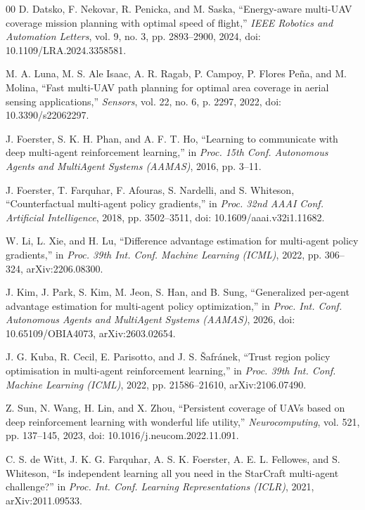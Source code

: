\documentclass[conference]{IEEEtran}
\begin{document}
\begin{thebibliography}{00}
D. Datsko, F. Nekovar, R. Penicka, and M. Saska, ``Energy-aware multi-UAV coverage mission planning with optimal speed of flight,'' \emph{IEEE Robotics and Automation Letters}, vol. 9, no. 3, pp. 2893--2900, 2024, doi: 10.1109/LRA.2024.3358581.

M. A. Luna, M. S. Ale Isaac, A. R. Ragab, P. Campoy, P. Flores Pe\~na, and M. Molina, ``Fast multi-UAV path planning for optimal area coverage in aerial sensing applications,'' \emph{Sensors}, vol. 22, no. 6, p. 2297, 2022, doi: 10.3390/s22062297.

J. Foerster, S. K. H. Phan, and A. F. T. Ho, ``Learning to communicate with deep multi-agent reinforcement learning,'' in \emph{Proc. 15th Conf. Autonomous Agents and MultiAgent Systems (AAMAS)}, 2016, pp. 3--11.

J. Foerster, T. Farquhar, F. Afouras, S. Nardelli, and S. Whiteson, ``Counterfactual multi-agent policy gradients,'' in \emph{Proc. 32nd AAAI Conf. Artificial Intelligence}, 2018, pp. 3502--3511, doi: 10.1609/aaai.v32i1.11682.

W. Li, L. Xie, and H. Lu, ``Difference advantage estimation for multi-agent policy gradients,'' in \emph{Proc. 39th Int. Conf. Machine Learning (ICML)}, 2022, pp. 306--324, arXiv:2206.08300.

J. Kim, J. Park, S. Kim, M. Jeon, S. Han, and B. Sung, ``Generalized per-agent advantage estimation for multi-agent policy optimization,'' in \emph{Proc. Int. Conf. Autonomous Agents and MultiAgent Systems (AAMAS)}, 2026, doi: 10.65109/OBIA4073, arXiv:2603.02654.

J. G. Kuba, R. Cecil, E. Parisotto, and J. S. \v{S}afr\'anek, ``Trust region policy optimisation in multi-agent reinforcement learning,'' in \emph{Proc. 39th Int. Conf. Machine Learning (ICML)}, 2022, pp. 21586--21610, arXiv:2106.07490.

Z. Sun, N. Wang, H. Lin, and X. Zhou, ``Persistent coverage of UAVs based on deep reinforcement learning with wonderful life utility,'' \emph{Neurocomputing}, vol. 521, pp. 137--145, 2023, doi: 10.1016/j.neucom.2022.11.091.

C. S. de Witt, J. K. G. Farquhar, A. S. K. Foerster, A. E. L. Fellowes, and S. Whiteson, ``Is independent learning all you need in the StarCraft multi-agent challenge?'' in \emph{Proc. Int. Conf. Learning Representations (ICLR)}, 2021, arXiv:2011.09533.


\end{thebibliography}
\end{document}
